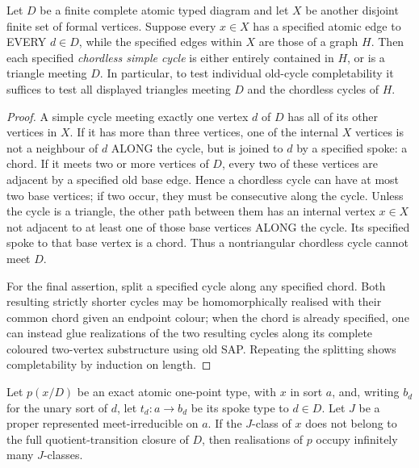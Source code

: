 \begin{lemma}
\label{lem:typed-complete-base-chords}
Let $D$ be a finite complete atomic typed diagram and
let $X$ be another disjoint finite set of formal vertices.
Suppose every $x\in X$ has a specified atomic edge to
EVERY $d\in D$, while the specified edges within $X$
are those of a graph $H$. Then each specified
\emph{chordless simple cycle} is either entirely contained
in $H$, or is a triangle meeting $D$.
In particular, to test individual old-cycle completability
it suffices to test all displayed triangles meeting $D$
and the chordless cycles of $H$.
\end{lemma}
\begin{proof}
A simple cycle meeting exactly one vertex $d$ of $D$
has all of its other vertices in $X$. If it has more
than three vertices, one of the internal $X$ vertices
is not a neighbour of $d$ ALONG the cycle, but is joined
to $d$ by a specified spoke: a chord.
If it meets two or more vertices of $D$, every two
of these vertices are adjacent by a specified old
base edge. Hence a chordless cycle can have at most
two base vertices; if two occur, they must be
consecutive along the cycle. Unless the cycle is a
triangle, the other path between them has an internal
vertex $x\in X$ not adjacent to at least one of those
base vertices ALONG the cycle. Its specified spoke
to that base vertex is a chord. Thus a nontriangular
chordless cycle cannot meet $D$.

For the final assertion, split a specified cycle along
any specified chord. Both resulting strictly shorter
cycles may be homomorphically realised with their
common chord given an endpoint colour; when the chord
is already specified, one can instead glue realizations
of the two resulting cycles along its complete coloured
two-vertex substructure using old SAP. Repeating the
splitting shows completability by induction on length.
\end{proof}

\begin{lemma}
\label{lem:typed-exact-orbit-infinitude}
Let \(p(x/D)\) be an exact atomic one-point type, with \(x\) in sort \(a\),
and, writing \(b_d\) for the unary sort of \(d\), let
\(t_d:a\to b_d\) be its spoke type to \(d\in D\).  Let \(J\) be a proper
represented meet-irreducible on \(a\).  If the \(J\)-class of \(x\) does
not belong to the full quotient-transition closure of \(D\), then
realisations of \(p\) occupy infinitely many \(J\)-classes.
\end{lemma}

